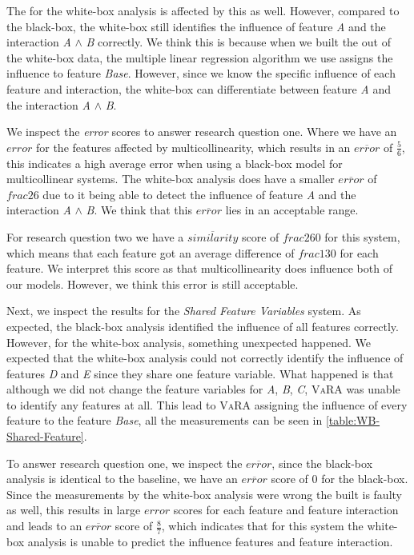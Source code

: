 The {\perfInfluenceModel} for the white-box analysis is affected by this as well.
However, compared to the black-box, the white-box still identifies the influence of feature \emph{A} and
the interaction \emph{A} $\land$ \emph{B} correctly. We think this is because when we built the {\perfInfluenceModel} out of the white-box data,
the multiple linear regression algorithm we use assigns the influence to feature \emph{Base}.
However, since we know the specific influence of each feature and interaction,
the white-box can differentiate between feature \emph{A} and the interaction \emph{A} $\land$ \emph{B}.

We inspect the \emph{error} scores to answer research question one. Where we have an $error$ for the features affected by multicollinearity,
which results in an $\overline{error}$ of $\frac{5}{6}$, this indicates a high average error when using a black-box model for multicollinear systems.
The white-box analysis does have a smaller $\overline{error}$ of $frac{2}{6}$ due to it being able to detect the influence of feature \emph{A} and
the interaction \emph{A} $\land$ \emph{B}. We think that this $\overline{error}$ lies in an acceptable range.

For research question two we have a $\overline{similarity}$ score of $frac{2}{60}$ for this system,
which means that each feature got an average difference of $frac{1}{30}$ for each feature. 
We interpret this score as that multicollinearity does influence both of our models. 
However, we think this error is still acceptable.

Next, we inspect the results for the \emph{Shared Feature Variables} system. 
As expected, the black-box analysis identified the influence of all features correctly. 
However, for the white-box analysis, something unexpected happened. 
We expected that the white-box analysis could not correctly identify the influence of features \emph{D} and \emph{E} since they share one
feature variable. What happened is that although we did not change the feature variables for \emph{A}, \emph{B}, \emph{C}, \textsc{VaRA} 
was unable to identify any features at all. This lead to \textsc{VaRA} assigning the influence of every feature to the feature \emph{Base},
all the measurements can be seen in \autoref{table:WB-Shared-Feature}.

To answer research question one, we inspect the $\overline{error}$, since the black-box analysis is identical to the baseline, we have an 
$\overline{error}$ score of $0$ for the black-box. Since the measurements by the white-box analysis were wrong the {\perfInfluenceModel} built
is faulty as well, this results in large $error$ scores for each feature and feature interaction and leads to an $\overline{error}$ score
of $\frac{8}{7}$, which indicates that for this system the white-box analysis is unable to predict the influence features and feature interaction.

